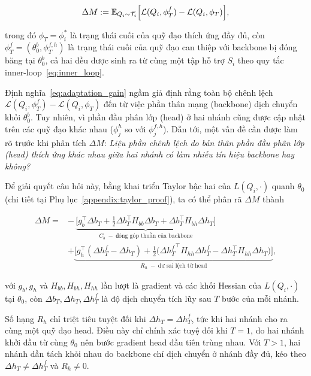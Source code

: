 \begin{equation}
    \centering
    \Delta M := \mathbb{E}_{Q_i \sim \mathcal{T}_i} \Big[ \mathcal{L}(Q_i, \phi_T^{f}) - \mathcal{L}(Q_i, \phi_T) \Big],
    \label{eq:adaptation_gain}
\end{equation}

trong đó $\phi_T = \phi_i^*$ là trạng thái cuối của quỹ đạo thích ứng đầy đủ, còn $\phi_T^{f} = (\theta_0^{b}, \phi_T^{f,h})$ là trạng thái cuối của quỹ đạo can thiệp với backbone bị đóng băng tại $\theta_0^{b}$, cả hai đều được sinh ra từ cùng một tập hỗ trợ $S_i$ theo quy tắc inner-loop~\eqref{eq:inner_loop}.

Định nghĩa~\eqref{eq:adaptation_gain} ngầm giả định rằng toàn bộ chênh lệch $\mathcal{L}(Q_i,\phi_T^f) - \mathcal{L}(Q_i,\phi_T)$ đến từ việc phần thân mạng (backbone) dịch chuyển khỏi $\theta_0^b$. Tuy nhiên, vì phần đầu phân lớp (head) ở hai nhánh cũng được cập nhật trên các quỹ đạo khác nhau ($\phi_j^h$ so với $\phi_j^{f,h}$). Dẫn tới, một vấn đề cần được làm rõ trước khi phân tích $\Delta M$: \emph{Liệu phần chênh lệch do bản thân phần đầu phân lớp (head) thích ứng khác nhau giữa hai nhánh có làm nhiễu tín hiệu backbone hay không?} 

Để giải quyết câu hỏi này, bằng khai triển Taylor bậc hai của $L(Q_i,\cdot)$ quanh $\theta_0$ (chi tiết tại Phụ lục~\ref{appendix:taylor_proof}), ta có thể phân rã $\Delta M$ thành

\begin{equation}
    \begin{split}
        \Delta M = & -\,\underbrace{\Big[g_b^\top \Delta b_T + \tfrac{1}{2}\Delta b_T^\top H_{bb} \Delta b_T + \Delta b_T^\top H_{bh} \Delta h_T\Big]}_{C_b \;-\; \text{đóng góp thuần của backbone}} \\
    &+ \underbrace{\Big[g_h^\top(\Delta h_T^f - \Delta h_T) + \tfrac{1}{2}\big({\Delta h_T^f}^\top H_{hh} \Delta h_T^f - \Delta h_T^\top H_{hh} \Delta h_T\big)\Big]}_{R_h \;-\; \text{dư sai lệch từ head}},
    \end{split}
    \label{eq:decomposition}
\end{equation}

với $g_b, g_h$ và $H_{bb}, H_{bh}, H_{hh}$ lần lượt là gradient và các khối Hessian của $L(Q_i,\cdot)$ tại $\theta_0$, còn $\Delta b_T, \Delta h_T, \Delta h_T^f$ là độ dịch chuyển tích lũy sau $T$ bước của mỗi nhánh.

Số hạng $R_h$ chỉ triệt tiêu tuyệt đối khi $\Delta h_T = \Delta h_T^f$, tức khi hai nhánh cho ra cùng một quỹ đạo head. Điều này chỉ chính xác tuyệ đối khi $T=1$, do hai nhánh khởi đầu từ cùng $\theta_0$ nên bước gradient head đầu tiên trùng nhau. Với $T>1$, hai nhánh dần tách khỏi nhau do backbone chỉ dịch chuyển ở nhánh đầy đủ, kéo theo $\Delta h_T \neq \Delta h_T^f$ và $R_h \neq 0$.

